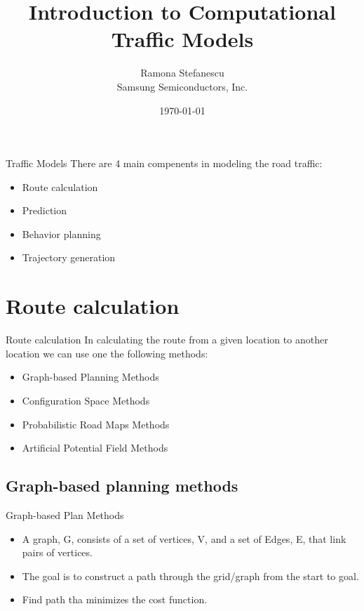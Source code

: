 \documentclass[10pt,mathserif]{beamer}
\title{\large \bfseries Introduction to Computational Traffic Models}
\author{Ramona Stefanescu\\[3ex]
Samsung Semiconductors, Inc.}
\date{\today}
\begin{document}
\frame{
\thispagestyle{empty}
\titlepage
}


\begin{frame}{Traffic Models}
There are 4 main compenents in modeling the road traffic: 
\begin{itemize}
\item Route calculation 
\item Prediction
\item Behavior planning
\item Trajectory generation
\end{itemize}
\end{frame}


\section{Route calculation}

\begin{frame}{Route calculation}
In calculating the route from a given location to another location we can use one the following methods: 
\begin{itemize}
\item Graph-based Planning Methods
\item Configuration Space Methods
\item Probabilistic Road Maps Methods
\item Artificial Potential Field Methods
\end{itemize}
\end{frame}


\subsection{Graph-based planning methods}
\begin{frame}{Graph-based Plan Methods}
\begin{itemize}
\item A graph, G, consists of a set of vertices, V, and a set of Edges, E, that link pairs
of vertices.
\item The goal is to construct a path through the grid/graph from the start to goal.
\item Find path tha minimizes the cost function.
\end{itemize}
\end{frame}
\end{document}
